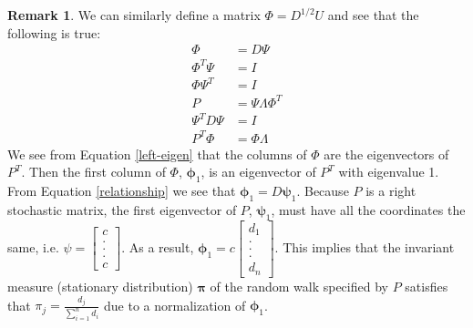 \documentclass[11pt]{article}
\theoremstyle{definition}
\newtheorem{remark}{Remark}
\begin{document}
\begin{remark}
We can similarly define a matrix $\Phi = D^{1/2}U$ and see that the following is true:
	\begin{align}
	\Phi &= D\Psi \label{relationship}\\
	\Phi^T\Psi &= I \label{phipsi}\\
	\Phi\Psi^T &= I\\
	P &= \Psi \Lambda \Phi^T \label{P}\\
	\Psi^T D \Psi &= I \label{psiDpsi}\\
	P^T \Phi &= \Phi \Lambda \label{left-eigen}
	\end{align}
We see from Equation \ref{left-eigen} that the columns of $\Phi$ are the eigenvectors of $P^T$. Then the first column of $\Phi$, $\boldsymbol{\phi}_1$, is an eigenvector of $P^T$ with eigenvalue 1. From Equation \ref{relationship} we see that $\boldsymbol{\phi}_1 = D \boldsymbol{\psi}_1$. Because $P$ is a right stochastic matrix, the first eigenvector of $P$, $\boldsymbol{\psi}_1$, must have all the coordinates the same, i.e. $\psi = \begin{bmatrix}c\\.\\.\\.\\c\end{bmatrix}$. As a result, $\boldsymbol{\phi}_1 = c\begin{bmatrix}
d_1\\.\\.\\.\\d_n
\end{bmatrix}$. This implies that the invariant measure (stationary distribution) $\boldsymbol{\pi}$ of the random walk specified by $P$ satisfies that $\pi_j = \frac{d_j}{\sum_{i=1}^{n}d_{i}}$ due to a normalization of $\boldsymbol{\phi}_1$.
\end{remark}
\end{document}
